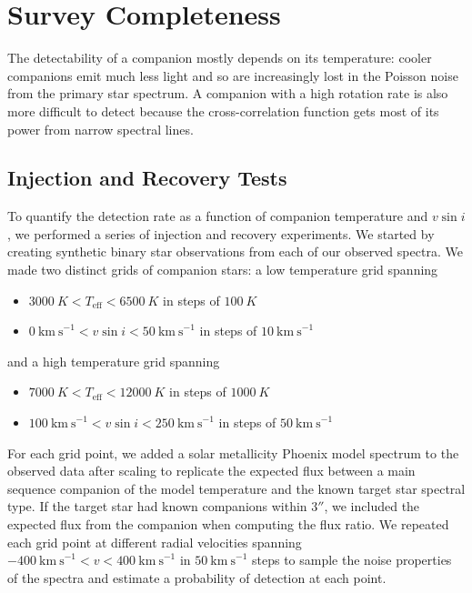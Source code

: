 \documentclass{emulateapj}
\begin{document}
\section{Survey Completeness}
\label{sec:completeness}

The detectability of a companion mostly depends on its temperature: cooler companions emit much less light and so are increasingly lost in the Poisson noise from the primary star spectrum. A companion with a high rotation rate is also more difficult to detect because the cross-correlation function gets most of its power from narrow spectral lines.  

\subsection{Injection and Recovery Tests}

To quantify the detection rate as a function of companion temperature and $v\sin{i}$, we performed a series of injection and recovery experiments. We started by creating synthetic binary star observations from each of our observed spectra. We made two distinct grids of companion stars: a low temperature grid spanning

\begin{itemize}
\item $3000\ K < T_\mathrm{eff} < 6500\ K$ in steps of $100\ K$
\item $0\ \mathrm{km\ s}^{-1} < v\sin{i} < 50\ \mathrm{km\ s}^{-1}$ in steps of $10\ \mathrm{km\ s}^{-1}$
\end{itemize}
and a high temperature grid spanning

\begin{itemize}
\item $7000\ K < T_\mathrm{eff} < 12000\ K$ in steps of $1000\ K$
\item $100\ \mathrm{km\ s}^{-1} < v\sin{i} < 250\ \mathrm{km\ s}^{-1}$ in steps of $50\ \mathrm{km\ s}^{-1}$
\end{itemize}
For each grid point, we added a solar metallicity Phoenix model spectrum to the observed data after scaling to replicate the expected flux between a main sequence companion of the model temperature and the known target star spectral type. If the target star had known companions within $3''$, we included the expected flux from the companion when computing the flux ratio. We repeated each grid point at different radial velocities spanning $-400\ \mathrm{km\ s}^{-1} < v < 400\ \mathrm{km\ s}^{-1}$ in $50\ \mathrm{km\ s}^{-1}$ steps to sample the noise properties of the spectra and estimate a probability of detection at each point.
\end{document}
